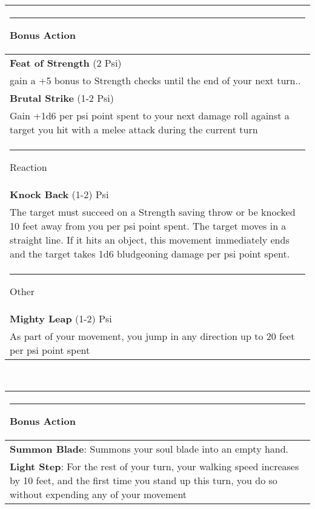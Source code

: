 \documentclass[twocolumn]{article}
\begin{document}
\\
\noindent\begin{tabular}{|m{3.1in}|}
\hline
\rule{1.1in}{0pt}Bonus Action\\
\hline
\textbf{Feat of Strength} (2 Psi)\\
gain	a	+5	bonus	to	Strength	checks	until	the	
end	of your	next	turn..\\
\textbf{Brutal Strike} (1-2 Psi)\\
Gain	+1d6 per psi point spent	to	your	next	damage	roll	against	a	
target	you	hit	with	a	melee	attack	during	the	
current	turn\\
\hline
\rule{1.2in}{0pt}Reaction\\
\hline
\textbf{Knock Back} (1-2) Psi\\
The	target	must	succeed	on	a	
Strength	saving	throw	or	be	knocked	10	feet	
away	from	you	per	psi	point	spent.	The	target	
moves	in	a	straight	line.	If	it	hits	an	object,	this	
movement	immediately	ends	and	the	target	
takes	1d6	bludgeoning	damage	per	psi	point	
spent.\\
\hline
\rule{1.3in}{0pt}Other\\
\hline
\textbf{Mighty Leap} (1-2) Psi\\
As	part	of	your	
movement,	you	jump	in	any	direction	up	to	20	
feet	per	psi	point	spent \\
\hline
\end{tabular}
\vspace{8pt}

\\
\noindent\begin{tabular}{|m{3.1in}|}
\hline
\rule{1.1in}{0pt}Bonus Action\\
\hline
\textbf{Summon Blade}: Summons your soul blade into an empty hand. \\
\hline
\textbf{Light Step}: For	the	rest	of	
your	turn,	your	walking	speed	increases	by	10	
feet,	and	the	first	time	you	stand	up this	turn,
you	do	so	without	expending	any	of	your	
movement\\
\hline
\end{tabular}
\vspace{8pt}
\end{document}

